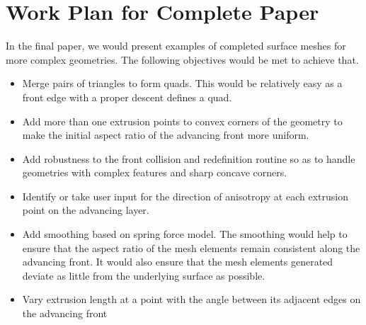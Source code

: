 \documentclass[conf]{new-aiaa}
\begin{document}
\section{Work Plan for Complete Paper}

In the final paper, we would present examples of completed surface meshes for more complex geometries. The following objectives would be met to achieve that.

\begin{itemize}
    \item Merge pairs of triangles to form quads. This would be relatively easy as a front edge with a proper descent defines a quad.
    \item Add more than one extrusion points to convex corners of the geometry to make the initial aspect ratio of the advancing front more uniform.
    \item Add robustness to the front collision and redefinition routine so as to handle geometries with complex features and sharp concave corners.
    \item Identify or take user input for the direction of anisotropy at each extrusion point on the advancing layer.
    \item Add smoothing based on spring force model. The smoothing would help to ensure that the aspect ratio of the mesh elements remain consistent along the advancing front. It would also ensure that the mesh elements generated deviate as little from the underlying surface as possible.
    \item Vary extrusion length at a point with the angle between its adjacent edges on the advancing front
\end{itemize}
\end{document}
